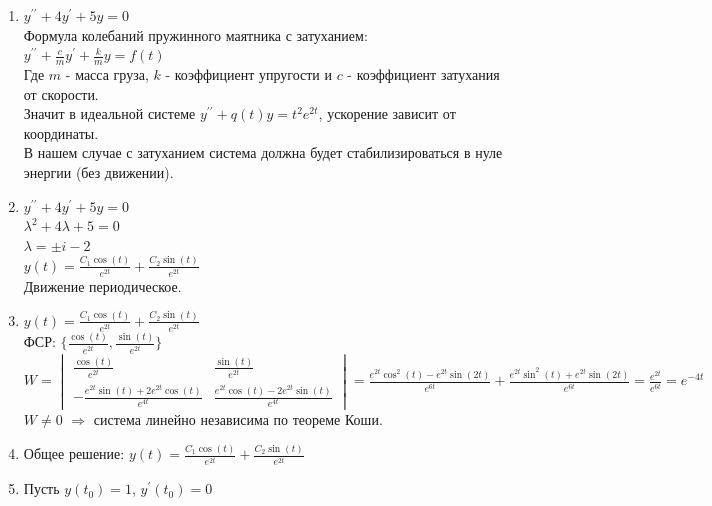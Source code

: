 \begin{enumerate}
    \item $y^{\prime\prime} + 4y^\prime + 5y = 0$ \\
        Формула колебаний пружинного маятника с затуханием: \\
        $y^{\prime\prime} + \frac{c}{m}y^\prime + \frac{k}{m}y = f(t)$ \\
        Где $m$ - масса груза, $k$ - коэффициент упругости и $c$ - коэффициент затухания от скорости. \\
        Значит в идеальной системе $y^{\prime\prime} + q(t)y = t^2 e^{2t}$, ускорение зависит от координаты. \\
        В нашем случае с затуханием система должна будет стабилизироваться в нуле энергии (без движении). \\
    \item $y^{\prime\prime} + 4y^\prime + 5y = 0$ \\
        $\lambda^2 + 4\lambda + 5 = 0$ \\
        $\lambda = \pm i - 2$ \\
        $y(t) = \frac{C_1 \cos(t)}{e^{2t}} + \frac{C_2 \sin(t)}{e^{2t}}$ \\
        Движение периодическое. \\
    \item $y(t) = \frac{C_1 \cos(t)}{e^{2t}} + \frac{C_2 \sin(t)}{e^{2t}}$ \\
        ФСР: $\{\frac{\cos(t)}{e^{2t}}, \frac{\sin(t)}{e^{2t}}\}$ \\
        $W = \begin{vmatrix}
            \frac{\cos(t)}{e^{2t}} & \frac{\sin(t)}{e^{2t}} \\
            -\frac{e^{2t}\sin(t) + 2e^{2t}\cos(t)}{e^{4t}} & \frac{e^{2t}\cos(t) - 2e^{2t}\sin(t)}{e^{4t}}
        \end{vmatrix} = \frac{e^{2t}\cos^2(t) - e^{2t}\sin(2t)}{e^{6t}} + \frac{e^{2t}\sin^2(t) + e^{2t}\sin(2t)}{e^{6t}} = \frac{e^{2t}}{e^{6t}} = e^{-4t}$ \\
        $W \neq 0$ $\Longrightarrow$ система линейно независима по теореме Коши. \\
    \item Общее решение: $y(t) = \frac{C_1 \cos(t)}{e^{2t}} + \frac{C_2 \sin(t)}{e^{2t}}$ \\
    \item Пусть $y(t_0) = 1$, $y^\prime(t_0) = 0$


\end{enumerate}
